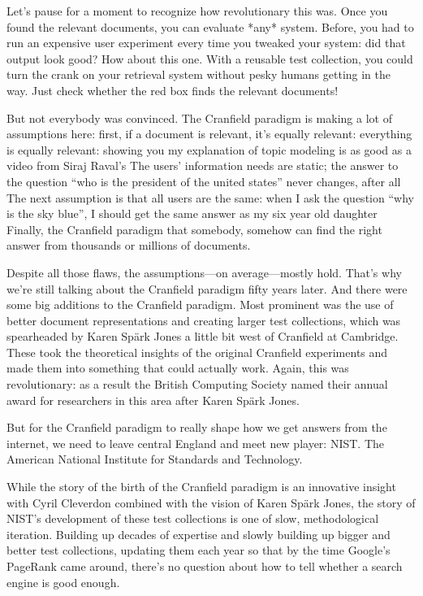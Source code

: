Let’s pause for a moment to recognize how revolutionary this was.  Once you found the relevant documents, you can evaluate *any* system.  Before, you had to run an expensive user experiment every time you tweaked your system: did that output look good?  How about this one.  With a reusable test collection, you could turn the crank on your retrieval system without pesky humans getting in the way.  Just check whether the red box finds the relevant documents!

But not everybody was convinced.  The Cranfield paradigm is making a lot of assumptions here: 
first, if a document is relevant, it’s equally relevant: everything is equally relevant: showing you my explanation of topic modeling is as good as a video from Siraj Raval’s
The users’ information needs are static; the answer to the question “who is the president of the united states” never changes, after all
The next assumption is that all users are the same: when I ask the question “why is the sky blue”, I should get the same answer as my six year old daughter
Finally, the Cranfield paradigm that somebody, somehow can find the right answer from thousands or millions of documents.

Despite all those flaws, the assumptions—on average—mostly hold.  That’s why we’re still talking about the Cranfield paradigm fifty years later.  And there were some big additions to the Cranfield paradigm.  Most prominent was the use of better document representations and creating larger test collections, which was spearheaded by Karen Spärk Jones a little bit west of Cranfield at Cambridge.  These took the theoretical insights of the original Cranfield experiments and made them into something that could actually work.  Again, this was revolutionary: as a result the British Computing Society named their annual award for researchers in this area after Karen Spärk Jones.

But for the Cranfield paradigm to really shape how we get answers from the internet, we need to leave central England and meet new player: NIST.  The American National Institute for Standards and Technology.  

While the story of the birth of the Cranfield paradigm is an innovative insight with Cyril Cleverdon combined with the vision of Karen Spärk Jones, the story of NIST’s development of these test collections is one of slow, methodological iteration.  Building up decades of expertise and slowly building up bigger and better test collections, updating them each year so that by the time Google’s PageRank came around, there’s no question about how to tell whether a search engine is good enough.

